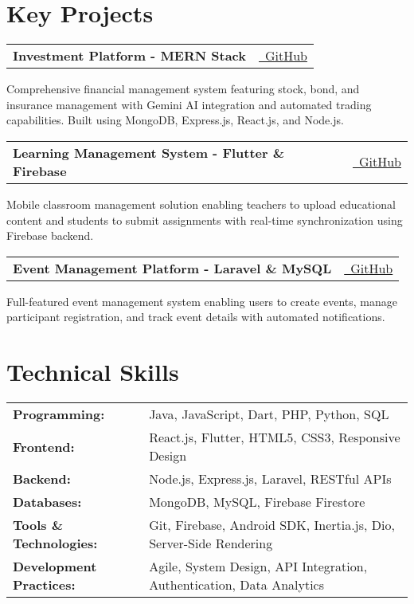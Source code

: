\documentclass[10pt,a4paper]{article}
\makeatletter
\newcommand{\resumeProject}[3]{
  \vspace{-1pt}
  \begin{tabular*}{\textwidth}[t]{l@{\extracolsep{\fill}}r}
    \textbf{#1} & #2 \\
  \end{tabular*}
  \noindent
  \small{#3}
  \vspace{0.3em}
}
\makeatother
\begin{document}
\section{Key Projects}

\resumeProject
{Investment Platform - MERN Stack}
{\href{https://github.com/richiebthomas/FinalSubmissionCodeCrafter}{\faGithub\ GitHub}}
{Comprehensive financial management system featuring stock, bond, and insurance management with Gemini AI integration and automated trading capabilities. Built using MongoDB, Express.js, React.js, and Node.js.}

\resumeProject
{Learning Management System - Flutter \& Firebase}
{\href{https://github.com/richiebthomas/flutter_LMS_app}{\faGithub\ GitHub}}
{Mobile classroom management solution enabling teachers to upload educational content and students to submit assignments with real-time synchronization using Firebase backend.}


\resumeProject
{Event Management Platform - Laravel \& MySQL}
{\href{https://github.com/richiebthomas/yetamax}{\faGithub\ GitHub}}
{Full-featured event management system enabling users to create events, manage participant registration, and track event details with automated notifications.}

\vspace{0.1em}

\section{Technical Skills}
\begin{tabular*}{\textwidth}{@{}p{}@{\hspace{0.02\textwidth}}p{}@{}}
\textbf{Programming:} & Java, JavaScript, Dart, PHP, Python, SQL \\[2pt]
\textbf{Frontend:} & React.js, Flutter, HTML5, CSS3, Responsive Design \\[2pt]
\textbf{Backend:} & Node.js, Express.js, Laravel, RESTful APIs \\[2pt]
\textbf{Databases:} & MongoDB, MySQL, Firebase Firestore \\[2pt]
\textbf{Tools \& Technologies:} & Git, Firebase, Android SDK, Inertia.js, Dio, Server-Side Rendering \\[2pt]
\textbf{Development Practices:} & Agile, System Design, API Integration, Authentication, Data Analytics \\
\end{tabular*}
\end{document}
